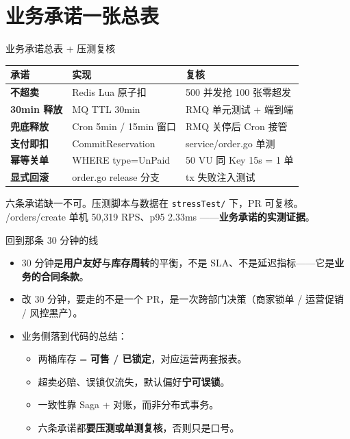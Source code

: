 \section{业务承诺一张总表}

\begin{frame}{业务承诺总表 + 压测复核}
\begin{tabular}{@{}lll@{}}
\toprule
承诺 & 实现 & 复核 \\
\midrule
\textbf{不超卖}      & Redis Lua 原子扣        & 500 并发抢 100 张零超发 \\
\textbf{30min 释放} & MQ TTL 30min            & RMQ 单元测试 + 端到端 \\
\textbf{兜底释放}    & Cron 5min / 15min 窗口  & RMQ 关停后 Cron 接管 \\
\textbf{支付即扣}    & CommitReservation       & service/order.go 单测 \\
\textbf{幂等关单}    & WHERE type=UnPaid       & 50 VU 同 Key 15s = 1 单 \\
\textbf{显式回滚}    & order.go release 分支    & tx 失败注入测试 \\
\bottomrule
\end{tabular}
\vspace{2mm}
\small 六条承诺缺一不可。压测脚本与数据在 \texttt{stressTest/} 下，PR 可复核。\\
/orders/create 单机 50{,}319 RPS、p95 2.33ms ——\textbf{业务承诺的实测证据}。
\end{frame}

\begin{frame}{回到那条 30 分钟的线}
\begin{itemize}
  \item 30 分钟是\textbf{用户友好}与\textbf{库存周转}的平衡，不是 SLA、不是延迟指标——它是\textbf{业务的合同条款}。
  \item 改 30 分钟，要走的不是一个 PR，是一次跨部门决策（商家锁单 / 运营促销 / 风控黑产）。
  \item 业务侧落到代码的总结：
  \begin{itemize}
    \item 两桶库存 = \textbf{可售 / 已锁定}，对应运营两套报表。
    \item 超卖必赔、误锁仅流失，默认偏好\textbf{宁可误锁}。
    \item 一致性靠 Saga + 对账，而非分布式事务。
    \item 六条承诺都\textbf{要压测或单测复核}，否则只是口号。
  \end{itemize}
\end{itemize}
\end{frame}

